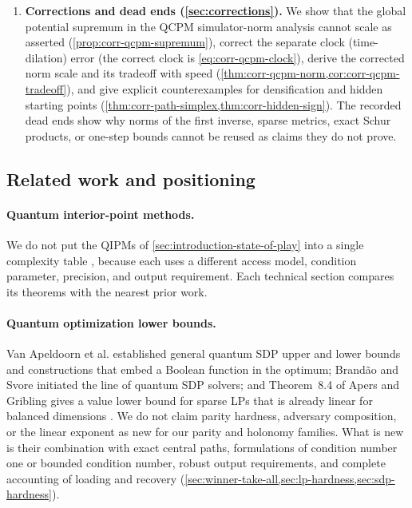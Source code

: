 \begin{enumerate}[leftmargin=*]
 \item \textbf{Corrections and dead ends (\cref{sec:corrections}).}  We show
 that the global potential supremum in the QCPM simulator-norm analysis
 cannot scale as asserted (\cref{prop:corr-qcpm-supremum}), correct the
 separate clock (time-dilation) error (the correct clock is
 \cref{eq:corr-qcpm-clock}), derive the
 corrected norm scale and its tradeoff with speed
 (\cref{thm:corr-qcpm-norm,cor:corr-qcpm-tradeoff}), and give explicit
 counterexamples for densification and hidden starting points
 (\cref{thm:corr-path-simplex,thm:corr-hidden-sign}).  The recorded dead ends
 show why norms of the first inverse, sparse metrics, exact Schur products, or
 one-step bounds cannot be reused as claims they do not prove.
\end{enumerate}

\subsection{Related work and positioning}
\label{sec:introduction-related-work}

\paragraph{Quantum interior-point methods.}
We do not put the QIPMs of \cref{sec:introduction-state-of-play} into a
single complexity table
\cite{kerenidis2020-quantum-interior-point-method-lps,
casares2020-quantum-interior-point-predictor-corrector,
augustino2023-quantum-interior-point-methods-semidefinite,
mohammadisiahroudi2025-inexact-feasible-interior-point-method,
wu2023-inexact-feasible-quantum-interior-point,
apers2026-quantum-speedups-linear-programming-interior,
dalzell2025-quantum-interior-point-methods,
augustino2024-quantum-central-path-algorithm-linear,
gribling2025-self-concordant-schrodinger-operators-spectral}, because each
uses a different access model, condition parameter, precision, and output
requirement.  Each technical section compares its theorems with the nearest
prior work.

\paragraph{Quantum optimization lower bounds.}
Van Apeldoorn et al. established general quantum SDP upper and lower bounds
and constructions that embed a Boolean function in the optimum;
Brand\~ao and Svore initiated the line of quantum SDP solvers; and
Theorem~8.4 of Apers and Gribling gives a value lower bound for sparse LPs
that is already linear for balanced dimensions
\cite{apeldoorn2020-quantum-sdp-solvers,
fernando2017-quantum-speed-ups-solving-semidefinite,
apers2026-quantum-speedups-linear-programming-interior}.  We do not claim
parity hardness, adversary composition, or the linear exponent as new for our
parity and holonomy families.  What is new is their combination with exact
central paths, formulations of condition number one or bounded condition
number, robust output requirements, and complete accounting of loading and
recovery (\cref{sec:winner-take-all,sec:lp-hardness,sec:sdp-hardness}).

